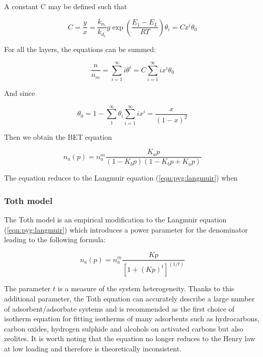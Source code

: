 A constant C may be defined such that

\begin{equation}
    C = \frac{y}{x} = \frac{k_{a_1}}{k_{d_1}} g \exp{(\frac{E_1 - E_L}{RT})}
    \theta_i = C x^i \theta_0
\end{equation}

For all the layers, the equations can be summed:

\begin{equation}
    \frac{n}{n_m} = \sum_{i=1}^{\infty} i \theta^i = C \sum_{i=1}^{\infty} i x^i \theta_0
\end{equation}

And since

\begin{equation}
    \theta_0 = 1 - \sum_{1}^{\infty} \theta_i
    \sum_{i=1}^{\infty} i x^i = \frac{x}{(1-x)^2}
\end{equation}

Then we obtain the BET equation

\begin{equation}\label{eqn:pyg:bet}
    n_a(p) = n_a^m \frac{K_a p}{(1-K_b p)(1-K_b p+ K_a p)}
\end{equation}

The equation reduces to the Langmuir equation (\ref{eqn:pyg:langmuir}) when

\subsubsection{Toth model}

The Toth model is an empirical modification to the Langmuir equation
(\ref{eqn:pyg:langmuir})
which introduces a power parameter for the denominator leading to
the following formula:

\begin{equation}\label{eqn:pyg:toth}
    n_a(p) = n_a^m \frac{K p}{[1 + (K p)^t]^(1/t)}
\end{equation}

The parameter \(t\) is a measure of the system heterogeneity. Thanks to this
additional parameter, the Toth equation can accurately describe a
large number of adsorbent/adsorbate systems and is recommended as the first
choice of isotherm equation for fitting isotherms of many adsorbents such as
hydrocarbons, carbon oxides, hydrogen sulphide and alcohols on activated carbons
but also zeolites.
It is worth noting that the equation no longer reduces to the Henry law 
at low loading and therefore is theoretically inconsistent.


